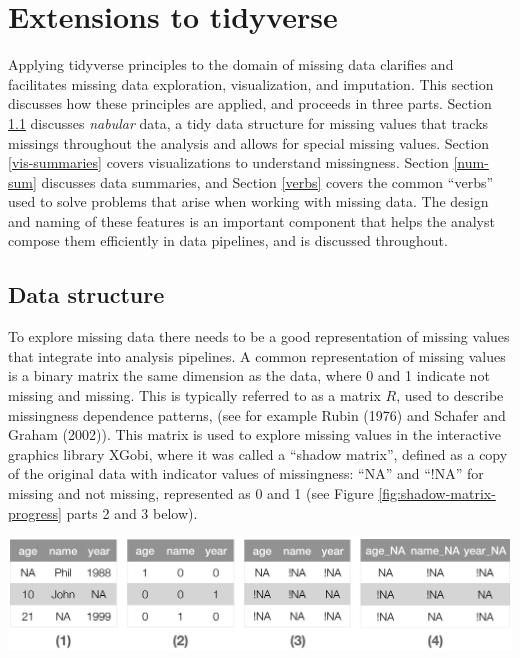 \documentclass[]{article}
\let\origfigure\figure
\let\endorigfigure\endfigure
\renewenvironment{figure}[1][2] {
    \expandafter\origfigure\expandafter[H]
} {
    \endorigfigure
}
\theoremstyle{definition}
\theoremstyle{definition}
\theoremstyle{definition}
\theoremstyle{remark}
\begin{document}
\hypertarget{extensions}{%
\section{Extensions to tidyverse}\label{extensions}}

Applying tidyverse principles to the domain of missing data clarifies
and facilitates missing data exploration, visualization, and imputation.
This section discusses how these principles are applied, and proceeds in
three parts. Section \ref{data-structure} discusses \emph{nabular} data,
a tidy data structure for missing values that tracks missings throughout
the analysis and allows for special missing values. Section
\ref{vis-summaries} covers visualizations to understand missingness.
Section \ref{num-sum} discusses data summaries, and Section \ref{verbs}
covers the common ``verbs'' used to solve problems that arise when
working with missing data. The design and naming of these features is an
important component that helps the analyst compose them efficiently in
data pipelines, and is discussed throughout.

\hypertarget{data-structure}{%
\subsection{Data structure}\label{data-structure}}

To explore missing data there needs to be a good representation of
missing values that integrate into analysis pipelines. A common
representation of missing values is a binary matrix the same dimension
as the data, where 0 and 1 indicate not missing and missing. This is
typically referred to as a matrix \(R\), used to describe missingness
dependence patterns, (see for example Rubin (1976) and Schafer and
Graham (2002)). This matrix is used to explore missing values in the
interactive graphics library XGobi, where it was called a ``shadow
matrix'', defined as a copy of the original data with indicator values
of missingness: ``NA'' and ``!NA'' for missing and not missing,
represented as 0 and 1 (see Figure \ref{fig:shadow-matrix-progress}
parts 2 and 3 below).

\begin{figure}

{\centering \includegraphics[width=1\linewidth]{full-conversion-to-shadow} 

}

\caption{Progression of creating shadow matrix data. (1-2) Data to a binary representation of missings, (2-3) Binary format converted to a shadow matrix (3-4) New and improved shadow matrix with changed variable names. This clearly links a variable to its state of missingness.}\label{fig:shadow-matrix-progress}
\end{figure}
\end{document}
